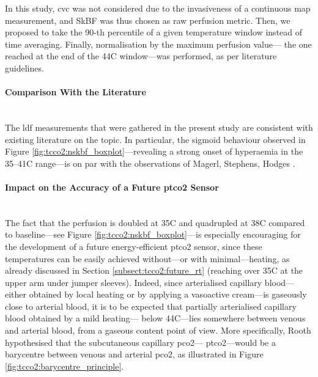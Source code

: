 In this study, \gls{cvc} was not considered due to the invasiveness of a continuous \gls{map} measurement, and SkBF was thus chosen as raw perfusion metric. Then, we proposed to take the 90-th percentile of a given temperature window instead of time averaging. Finally, normalisation by the maximum perfusion value---\ie{} the one reached at the end of the 44{\degree}C window---was performed, as per literature guidelines.

\paragraph{Comparison With the Literature}\mbox{}\\

The \gls{ldf} measurements that were gathered in the present study are consistent with existing literature on the topic. In particular, the sigmoid behaviour observed in Figure \ref{fig:tcco2:nskbf_boxplot}---revealing a strong onset of hyperaemia in the 35--41{\degree}C range---is on par with the observations of Magerl, Stephens, Hodges \etal{}\cite{magerl1996, stephens2001, hodges2016}.

\paragraph{Impact on the Accuracy of a Future \texorpdfstring{\gls{ptco2}}{tcpCO2} Sensor}\label{subsect:tcco2:frontiers:acc_impact}\mbox{}\\

The fact that the perfusion is doubled at 35{\degree}C and quadrupled at 38{\degree}C compared to baseline---see Figure \ref{fig:tcco2:nskbf_boxplot}---is especially encouraging for the development of a future energy-efficient \gls{ptco2} sensor, since these temperatures can be easily achieved without---or with minimal---heating, as already discussed in Section \ref{subsect:tcco2:future_rt} (reaching over 35{\degree}C at the upper arm under jumper sleeves). Indeed, since arterialised capillary blood---either obtained by local heating or by applying a vasoactive cream---is gaseously close to arterial blood\cite{zavorsky2007}, it is to be expected that partially arterialised capillary blood obtained by a mild heating---\ie{} below 44{\degree}C---lies somewhere between venous and arterial blood, from a gaseous content point of view. More specifically, Rooth \etal{}\cite{rooth1987} hypothesised that the subcutaneous capillary \gls{pco2}---\ie{} \gls{ptco2}---would be a barycentre between venous and arterial \gls{pco2}, as illustrated in Figure \ref{fig:tcco2:barycentre_principle}.

